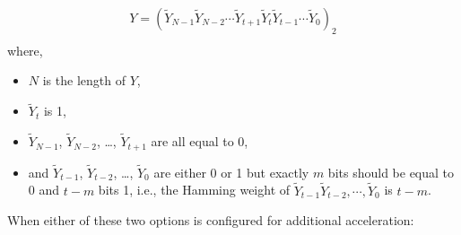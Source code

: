 \documentclass[main\_\_EN.tex]{subfiles}
\begin{document}
\begin{gather*}
Y = ( \widetilde{Y}_{N-1} \widetilde{Y}_{N-2} \cdots \widetilde{Y}_{t+1} \widetilde{Y}_{t} \widetilde{Y}_{t-1} \cdots \widetilde{Y}_{0} )_{2} \\
\end{gather*}
where,
\begin{itemize}
    \item \begin{math} N \end{math} is the length of \begin{math}Y \end{math},
    \item \begin{math}\widetilde{Y}_{t}\end{math} is 1,
    \item \begin{math}\widetilde{Y}_{N-1}\end{math}, \begin{math}\widetilde{Y}_{N-2}\end{math}, \dots, \begin{math}\widetilde{Y}_{t+1}\end{math} are all equal to 0,
    \item and \begin{math}\widetilde{Y}_{t-1}\end{math}, \begin{math}\widetilde{Y}_{t-2}\end{math}, \dots, \begin{math}\widetilde{Y}_{0}\end{math} are either 0 or 1 but exactly \begin{math}m\end{math} bits should be equal to 0 and \begin{math}t -m\end{math} bits 1, i.e., the Hamming weight of \begin{math}\widetilde{Y}_{t-1} \widetilde{Y}_{t-2}, \cdots, \widetilde{Y}_{0}\end{math} is \begin{math}t -m\end{math}.
\end{itemize}

When either of these two options is configured for additional acceleration:
\end{document}
